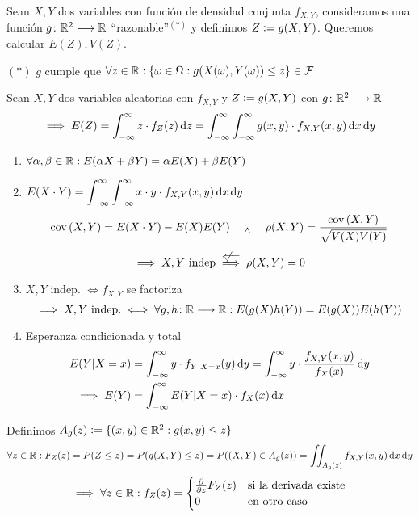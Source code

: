
Sean $X, Y$ dos variables con función de densidad conjunta $f_{X, Y}$, consideramos una función $g \colon \mathbb{R}^2 \longrightarrow \mathbb{R}$ ``razonable''$^{(*)}$ y definimos $Z \vcentcolon= g(X, Y)$. Queremos calcular $E(Z), V(Z)$.

\hfill $(*)$ $g$ cumple que $\displaystyle \forall z \in \mathbb{R} : \{\omega \in \Omega : g(X(\omega), Y(\omega)) \leq z\} \in \mathcal{F}$
\begin{teo}
	Sean $X, Y$ dos variables aleatorias con $f_{X, Y}$ y $Z \vcentcolon= g(X, Y)$ con $g \colon \mathbb{R}^2 \longrightarrow \mathbb{R}$
	\[\implies E(Z)= \int_{-\infty}^{\infty} z \cdot f_Z(z) \odif{z} = \int_{-\infty}^{\infty} \int_{-\infty}^{\infty} g(x, y) \cdot f_{X, Y} (x, y) \odif{x} \odif{y}\]
\end{teo}
\begin{obs}
	\begin{enumerate}
		\item $\displaystyle \forall \alpha, \beta \in \mathbb{R} : E(\alpha X + \beta Y) = \alpha E(X) + \beta E(Y)$
		\item $\ds E(X\cdot Y) = \int_{-\infty}^{\infty} \int_{-\infty}^{\infty} x\cdot y \cdot f_{X, Y}(x, y) \odif{x} \odif{y}$
		      \[\operatorname{cov}\left(X, Y\right) = E(X\cdot Y) - E(X)E(Y) \quad\; _{\wedge} \;\quad \rho(X, Y) = \frac{\operatorname{cov}\left(X, Y\right)}{\sqrt{V(X)V(Y)}}\]
		      \[\implies X, Y \tex{ indep} \stackrel{\nimpliedby}{\implies} \rho(X, Y) = 0\]
		\item $X, Y$ indep. $\iff f_{X, Y}$ se factoriza
		      \[\implies X, Y \text{ indep.}\iff \forall g, h \colon \mathbb{R} \longrightarrow \mathbb{R} : E(g(X)h(Y)) = E(g(X))E(h(Y))\]
		\item Esperanza condicionada y total
		      \[\begin{aligned}
				      E(Y \vert X=x) & = \int_{-\infty}^{\infty} y\cdot f_{Y\vert X=x} (y) \odif{y} = \int_{-\infty}^{\infty} y\cdot \frac{f_{X, Y}(x, y)}{f_X(x)} \odif{y} \\
				      \implies E(Y)  & = \int_{-\infty}^{\infty} E(Y \vert X=x) \cdot f_X(x) \odif{x}
			      \end{aligned}\]
	\end{enumerate}
\end{obs}
Definimos $A_{g}(z) \vcentcolon= \{(x, y) \in \mathbb{R}^2 : g(x, y) \leq z\}$
\[\forall z \in \R : F_Z(z)= P(Z \leq z) = P(g(X, Y) \leq z) = P((X, Y) \in A_g(z)) = \iint_{A_{g}(z)} f_{X, Y}(x, y) \odif{x} \odif{y}\]
\[\implies \forall z \in \mathbb{R} : f_Z(z) = \begin{cases}
		\pdv{}{z} F_Z(z) & \text{si la derivada existe} \\
		0                & \text{en otro caso}
	\end{cases}\]
